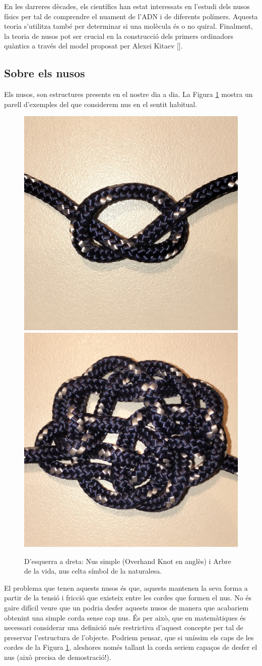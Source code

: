 En les darreres dècades, els científics han estat interessats en l'estudi dels nusos físics per tal de comprendre el nuament de l'ADN i de diferents polímers. Aquesta teoria s'utilitza també per determinar si una molècula és o no quiral. Finalment, la teoria de nusos pot ser crucial en la construcció dels primers ordinadors quàntics a través del model proposat per Alexei Kitaev [\cite{computingwithquantumknots}].\\

\subsection{Sobre els nusos}\label{subsec:sobreelsnusos}
Els nusos, son estructures presents en el nostre dia a dia. La Figura \ref{fig:exemples de nusos} mostra un parell d'exemples del que considerem nus en el sentit habitual.\\

\begin{figure}
  \centering
  \includegraphics[width=0.46\linewidth]{img/nus simple.jpg}
  \includegraphics[width=0.46\linewidth]{img/arbre de la vida.jpg}
  \caption{D'esquerra a dreta: Nus simple (Overhand Knot en anglès) i Arbre de la vida, nus celta símbol de la naturalesa.
  }\label{fig:exemples de nusos}
\end{figure}

El problema que tenen aquests nusos és que, aquests mantenen la seva forma a partir de la tensió i fricció que existeix entre les cordes que formen el nus. No és gaire difícil veure que un podria desfer aquests nusos de manera que acabariem obtenint una simple corda sense cap nus. És per això, que en matemàtiques és necessari considerar una definició més restrictiva d'aquest concepte per tal de preservar l'estructura de l'objecte. Podriem pensar, que si uníssim els caps de les cordes de la Figura \ref{fig:exemples de nusos}, aleshores només tallant la corda seriem capaços de desfer el nus (això precisa de demostració!).